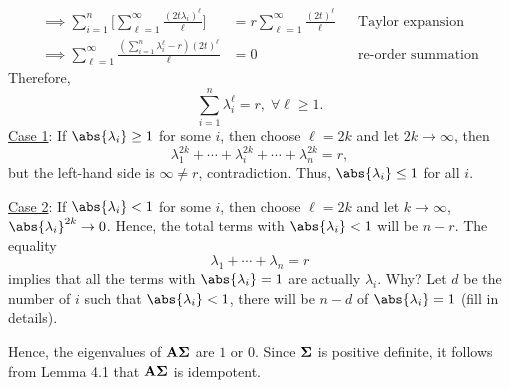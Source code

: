 \begin{Theorem}{}{}
\begin{align*}
            \implies \sum_{i=1}^{n}\biggl[\sum_{\ell=1}^{\infty}\frac{(2t\lambda_i)^\ell}{\ell}\biggr] & =r \sum_{\ell=1}^{\infty}\frac{(2t)^\ell}{\ell} &  & \text{Taylor expansion}   \\
            \implies \sum_{\ell=1}^{\infty}\frac{(\sum_{i=1}^{n}\lambda_i^\ell-r)(2t)^\ell}{\ell}      & =0                                              &  & \text{re-order summation}
      \end{align*}
      Therefore,
      \[ \sum_{i=1}^{n}\lambda_i^\ell=r,\; \forall \ell\ge 1. \]
      \underline{Case 1}: If $ \abs{\lambda_i}\ge 1 $ for some $ i $, then choose $ \ell=2k $ and let $ 2k\to\infty $,
      then
      \[ \lambda_1^{2k}+\cdots+\lambda_i^{2k}+\cdots+\lambda_n^{2k}=r, \]
      but the left-hand side is $ \infty\ne r $, contradiction. Thus, $ \abs{\lambda_i}\le 1 $ for all $ i $.

      \underline{Case 2}: If $ \abs{\lambda_i}<1 $ for some $ i $, then
      choose $ \ell=2k $ and let $ k\to\infty $, $ \abs{\lambda_i}^{2k}\to 0 $.
      Hence, the total terms with $ \abs{\lambda_i}<1 $ will be $ n-r $. The equality
      \[ \lambda_1+\cdots+\lambda_n=r \]
      implies that all the terms with $ \abs{\lambda_i}=1 $ are actually $ \lambda_i $. Why?
      Let $ d $ be the number of $ i $ such that $ \abs{\lambda_i}<1 $, there will be $ n-d $ of $ \abs{\lambda_i}=1 $ (fill in details).

      Hence, the eigenvalues of $ \mathbf{A\Sigma} $ are $ 1 $ or $ 0 $. Since
      $ \mathbf{\Sigma} $ is positive definite, it follows from Lemma 4.1 that $ \mathbf{A\Sigma} $ is idempotent.
\end{Theorem}
